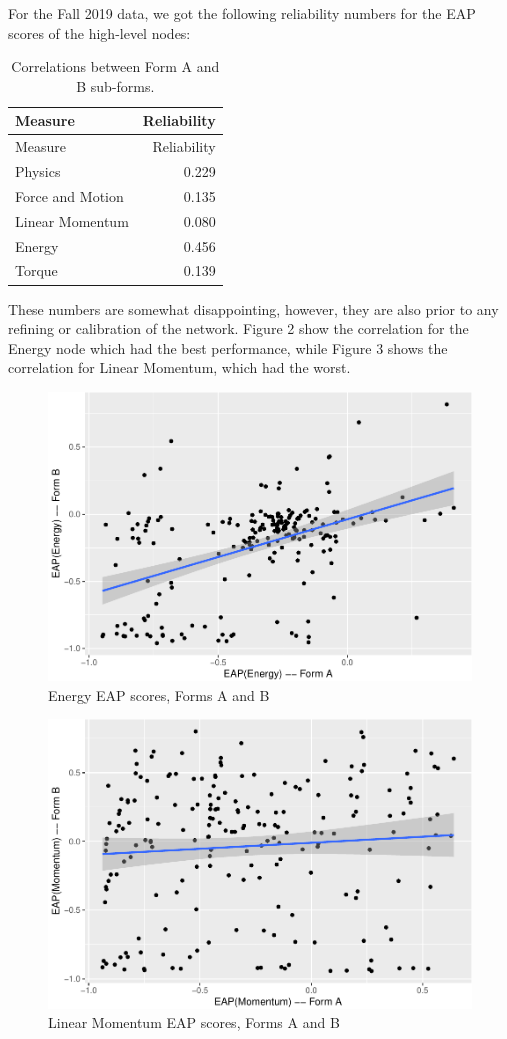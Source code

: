 \documentclass[]{article}
\begin{document}
For the Fall 2019 data, we got the following reliability numbers for the
EAP scores of the high-level nodes:

\begin{longtable}[]{@{}lr@{}}
\caption{Correlations between Form A and B sub-forms.}\tabularnewline
\toprule
Measure & Reliability\tabularnewline
\midrule
\endfirsthead
\toprule
Measure & Reliability\tabularnewline
\midrule
\endhead
Physics & 0.229\tabularnewline
Force and Motion & 0.135\tabularnewline
Linear Momentum & 0.080\tabularnewline
Energy & 0.456\tabularnewline
Torque & 0.139\tabularnewline
\bottomrule
\end{longtable}

These numbers are somewhat disappointing, however, they are also prior
to any refining or calibration of the network. Figure 2 show the
correlation for the Energy node which had the best performance, while
Figure 3 shows the correlation for Linear Momentum, which had the worst.

\begin{figure}
\centering
\includegraphics{PPReliablility_files/figure-latex/Energy-1.pdf}
\caption{Energy EAP scores, Forms A and B}
\end{figure}
\begin{figure}
\centering
\includegraphics{PPReliablility_files/figure-latex/Momentum-1.pdf}
\caption{Linear Momentum EAP scores, Forms A and B}
\end{figure}
\end{document}
